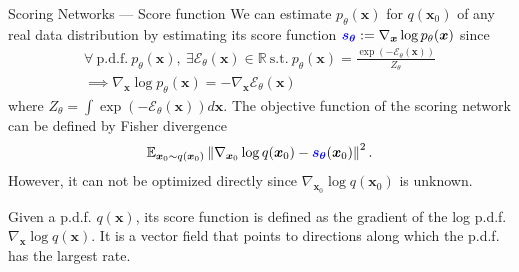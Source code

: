 \documentclass[10pt]{beamer}
\begin{document}
\begin{frame}{Scoring Networks --- \normalsize Score function}
    We can estimate $p_{\theta}(\bm{x})$ for $q(\bm{x}_0)$ of any real data distribution
    by estimating its score function $\textcolor{blue}{\bm{s}_{\bm{\theta}}}:=\nabla_{\bm{x}}\log p_{\theta}(\bm{x})$ since
    \begin{gather*}
        \forall~\text{p.d.f.}~p_{\theta}(\bm{x}),~\exists \mathcal{E}_{\theta}(\bm{x})\in \mathbb{R}~\text{s.t.}~p_{\theta}(\bm{x}) = \frac{\exp(-\mathcal{E}_{\theta}(\bm{x}))}{Z_{\theta}}\\
        \implies \nabla_{\bm{x}}\log p_{\theta}(\bm{x}) = -\nabla_{\bm{x}}\mathcal{E}_{\theta}(\bm{x})
    \end{gather*}
    where $Z_{\theta}=\int \exp(-\mathcal{E}_{\theta}(\bm{x}))d\bm{x}$. The objective function of the scoring network can be defined by Fisher divergence
    \begin{gather*}
    \mathbb{E}_{\bm{x}_0\sim q(\bm{x}_0)}\left\|
        \nabla_{\bm{x}_0}\log q(\bm{x}_0) - \textcolor{blue}{\bm{s}_{\bm{\theta}}}(\bm{x}_0)
    \right\|^2.
    \end{gather*}
    However, it can not be optimized directly since $\nabla_{\bm{x}_0}\log q(\bm{x}_0)$ is unknown.
    
    \medskip
    
    \begin{definition}
        Given a p.d.f. $q(\bm{x})$, its score function is defined as the gradient of the log p.d.f. $\nabla_{\bm{x}}\log q(\bm{x})$. It is a vector field that points to directions along which the p.d.f. has the largest rate. 
    \end{definition}
\end{frame}
\end{document}
